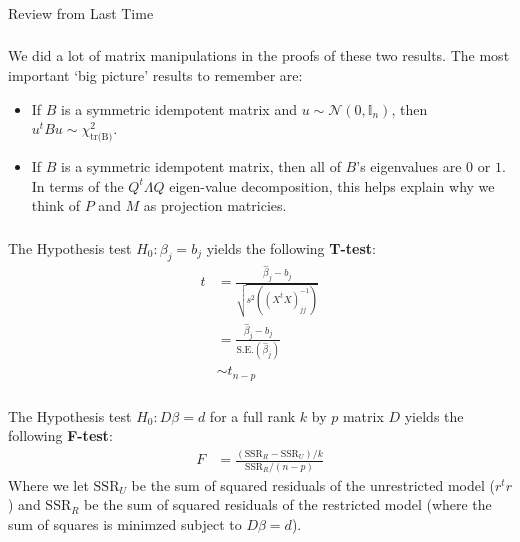 \begin{frame}[fragile] \frametitle{}

\begin{flushright}
{\color{yaleblue}\sc\fontsize{1cm}{0cm}\selectfont Review from Last Time}
\end{flushright}

\end{frame}

\begin{frame}[fragile] \frametitle{}

We did a lot of matrix manipulations in the proofs of these
two results. The most important `big picture' results to
remember are:

\begin{itemize}
\item If $B$ is a symmetric idempotent matrix and
$u \sim \mathcal{N} (0, \mathbb{I}_n)$, then
$u^t B u \sim \chi^2_{\text{tr(B)}}$. \pause
\item If $B$ is a symmetric idempotent matrix, then
all of $B$'s eigenvalues are $0$ or $1$. In terms of
the $Q^t \Lambda Q$ eigen-value decomposition, this
helps explain why we think of $P$ and $M$ as projection
matricies.
\end{itemize}

\end{frame}


\begin{frame}[fragile] \frametitle{}

The Hypothesis test $H_0: \beta_j = b_j$ yields the
following {\bf T-test}:
\begin{align*}
t &= \frac{\widehat{\beta}_j - b_j}{\sqrt{s^2  \left( (X^t X)^{-1}_{jj} \right)}} \\
&= \frac{\widehat{\beta}_j - b_j}{\text{S.E.}(\widehat{\beta}_j)} \\
&\sim t_{n-p}
\end{align*}

\end{frame}


\begin{frame}[fragile] \frametitle{}

The Hypothesis test $H_0: D\beta = d$ for a full rank $k$ by $p$ matrix
$D$ yields the following {\bf F-test}:
\begin{align*}
F &= \frac{(\text{SSR}_R -  \text{SSR}_U) / k }{\text{SSR}_R / (n - p)}
\end{align*}
Where we let $\text{SSR}_U$ be the sum of squared residuals of the unrestricted
model ($r^t r$) and $\text{SSR}_R$ be the sum of squared residuals of the
restricted model (where the sum of squares is minimzed subject
to $D\beta = d$).

\end{frame}

